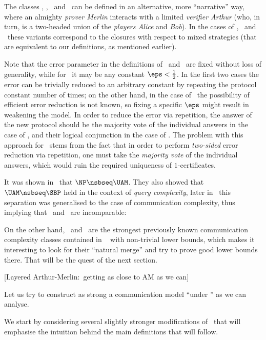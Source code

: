 The classes \AM, \MA, \UAMc\ and \UAM\ can be defined in an alternative, more ``narrative'' way, where an almighty \emph{prover Merlin} interacts with a limited \emph{verifier Arthur} (who, in turn, is a two-headed union of the \emph{players Alice} and \emph{Bob}).
In the cases of \AM, \UAMc\ and \UAM\ these variants correspond to the closures with respect to mixed strategies (that are equivalent to our definitions, as mentioned earlier).

Note that the error parameter in the definitions of \AM\ and \UAMc\ are fixed without loss of generality, while for \UAM\ it may be any constant $\eps<\frac12$.
In the first two cases the error can be trivially reduced to an arbitrary constant by repeating the protocol constant number of times; on the other hand, in the case of \UAM\ the possibility of efficient error reduction is not known, so fixing a specific $\eps$ might result in weakening the model.\fn
{
In order to reduce the error via repetition, the answer of the new protocol should be the majority vote of the individual answers in the case of \AM, and their logical conjunction in the case of \UAMc.
The problem with this approach for \UAM\ stems from the fact that in order to perform \emph{two-sided} error reduction via repetition, one must take the \emph{majority vote} of the individual answers, which would ruin the required uniqueness of $1$-certificates.
}

It was shown in~\cite{GPW15_Zero} that
$\NP \nsbseq \UAM$.
They also showed that $\UAM \nsbseq \SBP$ held in the context of \emph{query complexity}, later in~\cite{GLMWZ16_Rec} this separation was generalised to the case of communication complexity, thus implying that \UAM\ and \SBP\ are incomparable:

On the other hand, \UAM\ and \SBP\ are the strongest previously known
%
communication complexity classes contained in \AM\  %
with non-trivial lower bounds, which makes it interesting to look for their ``natural merge'' and try to prove good lower bounds there.
That will be the quest of the next section.

[Layered Arthur-Merlin:\ getting as close to AM as we can]

Let us try to construct as strong a communication model ``under \AM'' as we can analyse.

We start by considering several slightly stronger modifications of \MA\ that will emphasise the intuition behind the main definitions that will follow.

